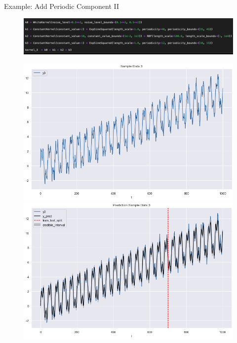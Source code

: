 \documentclass[10pt]{beamer}
\begin{document}
\begin{frame}{Example: Add Periodic Component II }
\begin{center}
\begin{figure}
\includegraphics[scale=0.3]{images/code_kernel_3_example3.png}
\end{figure}
\end{center}
\begin{center}
\begin{figure}
\includegraphics[scale=0.20]{images/sample_3_example3.png}
\includegraphics[scale=0.20]{images/pred_3_example3.png}
\end{figure}
\end{center}
\end{frame}
\end{document}
